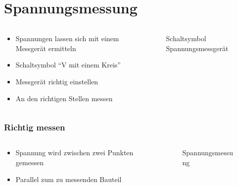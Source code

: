 
\section{Spannungsmessung}
\label{section:spannungsmessung}
\begin{frame}%

\begin{columns}
    \begin{column}{0.48\textwidth}
    \begin{itemize}
  \item Spannungen lassen sich mit einem Messgerät ermitteln
  \item Schaltsymbol \enquote{V mit einem Kreis}
  \item Messgerät richtig einstellen
  \item An den richtigen Stellen messen
  \end{itemize}

    \end{column}
   \begin{column}{0.48\textwidth}
       
\begin{figure}
    \caption{\scriptsize Schaltsymbol Spannungsmessgerät}
    \label{n_messgeraete_symbol_spannungsmessgerät}
\end{figure}


   \end{column}
\end{columns}

\end{frame}

\begin{frame}
\frametitle{Richtig messen}
\begin{columns}
    \begin{column}{0.48\textwidth}
    \begin{itemize}
  \item Spannung wird zwischen zwei Punkten gemessen
  \item Parallel zum zu messenden Bauteil
  \end{itemize}

    \end{column}
   \begin{column}{0.48\textwidth}
       
\begin{figure}
    \caption{\scriptsize Spannungsmessung}
    \label{n_messgeraete_spannungsmessung}
\end{figure}


   \end{column}
\end{columns}

\end{frame}

